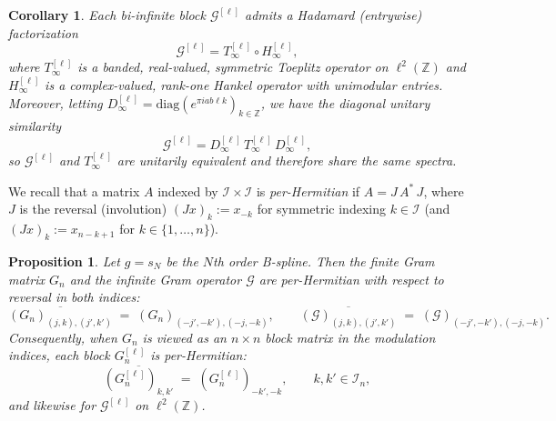 \documentclass{article}
\newtheorem{corollary}{Corollary}[theorem]
\newtheorem{proposition}[theorem]{Proposition}
\begin{document}
\begin{corollary}\label{cor:infBlocksTn}
Each bi-infinite block $\mathscr{G}^{[\ell]}$ admits a Hadamard (entrywise) factorization
\[
\mathscr{G}^{[\ell]} = T_{\infty}^{[\ell]} \circ H_{\infty}^{[\ell]},
\]
where $T_{\infty}^{[\ell]}$ is a banded, real-valued, symmetric Toeplitz operator on $\ell^2(\mathbb{Z})$
and $H_{\infty}^{[\ell]}$ is a complex-valued, rank-one Hankel operator with unimodular entries.
Moreover, letting $D_{\infty}^{[\ell]}=\mathrm{diag}(e^{\pi i a b \ell k})_{k\in\mathbb{Z}}$,
we have the diagonal unitary similarity
\[
\mathscr{G}^{[\ell]} = D_{\infty}^{[\ell]} \, T_{\infty}^{[\ell]} \, D_{\infty}^{[\ell]},
\]
so $\mathscr{G}^{[\ell]}$ and $T_{\infty}^{[\ell]}$ are unitarily equivalent and therefore share the same
spectra.
\end{corollary}



 
We recall that a matrix $A$ indexed by $\mathcal I\times\mathcal I$ is
\emph{per-Hermitian} if $A = J\,A^*\,J$, where $J$ is the reversal
(involution) $(Jx)_k := x_{-k}$ for symmetric indexing 
$k\in\mathcal I$ (and $(Jx)_k := x_{n-k+1}$ for $k\in\{1,\dots,n\}$).

\begin{proposition}\label{prop:perHermitian}
Let $g=s_N$ be the $N$th order B-spline. Then the finite Gram matrix $G_n$ and the infinite Gram operator $\mathscr{G}$
are per-Hermitian with respect to reversal in both indices:
\[
\overline{(G_n)_{(j,k),(j',k')}} \;=\; (G_n)_{(-j',-k'),(-j,-k)},
\qquad
\overline{(\mathscr{G})_{(j,k),(j',k')}} \;=\; (\mathscr{G})_{(-j',-k'),(-j,-k)}.
\]
Consequently, when $G_n$ is viewed as an $n\times n$ block matrix in the
modulation indices, each block $G_n^{[\ell]}$ is per-Hermitian:
\[
\overline{(G_n^{[\ell]})_{k,k'}} \;=\; (G_n^{[\ell]})_{-k',-k},
\qquad k,k'\in\mathcal I_n,
\]
and likewise for $\mathscr{G}^{[\ell]}$ on $\ell^2(\mathbb Z)$.
\end{proposition}
\end{document}
